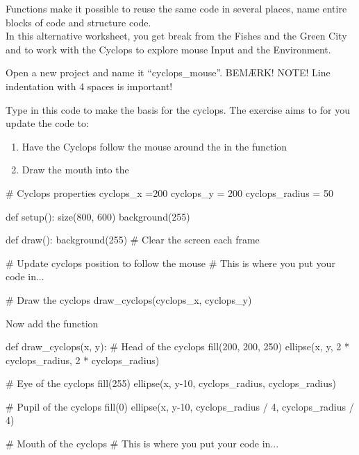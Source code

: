 \documentclass{ucph-handout}
\newcounter{handout}
\begin{document}
\newpage
{}

\begin{exercisebox}[adjusted title = Mouse input and Functions]
Functions make it possible to reuse the same code in several places,
name entire blocks of code and structure code.\\

In this alternative worksheet, you get break from the Fishes and the Green City and to work with the Cyclops to explore mouse Input and the Environment.

\noindent
Open a new project and name it ``cyclops\_mouse''. BEMÆRK! NOTE! Line indentation with 4 spaces is important!

Type in this code to make the basis for the cyclops. The exercise aims to for you update the code to:
\begin{enumerate}
\item Have the Cyclops follow the mouse around the in the   function
\item Draw the mouth into the 
\end{enumerate}


\begin{python}
# Cyclops properties
cyclops_x =200
cyclops_y = 200
cyclops_radius = 50

def setup():
    size(800, 600)
    background(255)

def draw():
    background(255)  # Clear the screen each frame

    # Update cyclops position to follow the mouse
    # This is where you put your code in...

    # Draw the cyclops
    draw_cyclops(cyclops_x, cyclops_y)
\end{python}

Now add the  function
\begin{python}
def draw_cyclops(x, y):
    # Head of the cyclops
    fill(200, 200, 250)
    ellipse(x, y, 2 * cyclops_radius, 2 * cyclops_radius)

    # Eye of the cyclops
    fill(255)
    ellipse(x, y-10, cyclops_radius, cyclops_radius)
    
    # Pupil of the cyclops
    fill(0)
    ellipse(x, y-10, cyclops_radius / 4, cyclops_radius / 4)
    
    # Mouth of the cyclops
    # This is where you put your code in...
    
    
\end{python}
\end{exercisebox}
\end{document}
